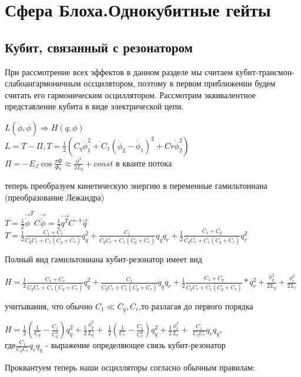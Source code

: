 \documentclass[12pt, twoside]{report}
\begin{document}
	\section{Сфера Блоха.Однокубитные гейты}

	\subsection{Кубит, связанный с резонатором}
	При рассмотрение всех эффектов в данном разделе мы считаем кубит-трансмон-слабоангармоничным оссцилятором, поэтому в первом приближении будем считать его гармоническим осциллятором. Рассмотрим эквивалентное представление кубита в виде электрической цепи.
\begin{center}
$L(\dot{\phi},\phi)\Rightarrow H(q,\phi)$\\
	$L=T-\Pi, T=\frac{1}{2}(C_{q}\dot{\phi}_1^2 + C_1(\dot{\phi}_2 - \dot{\phi}_1)^2 + Cr\dot{\phi}_2^2)$\\
	$\Pi= -E_J\cos{\frac{\pi\Phi}{\Phi_0}} \approx \frac{\phi^2}{2L_q}+const$ в кванте потока
\end{center}
	теперь преобразуем кинетическую энергию в переменные гамильтониана (преобразование Лежандра)
\begin{center}	
	$T=\frac{1}{2}\vec{\dot{\phi}}^TC\vec{\dot{\phi}} = \frac{1}{2}\vec{q^T}C^{-1}\vec{q}$
	$T=\frac{1}{2}\frac{C_1+C_r}{C_qC_r + C_1(C_q + C_r)}q_q^2+
	\frac{C_1}{C_qC_r + C_1(C_q+C_r)}q_qq_r+
	\frac{1}{2}\frac{C_1 + C_q} {C_qC_r + C_1(C_q + C_r)}q_r^2$\\
\end{center}
Полный вид гамильтониана кубит-резонатор имеет вид
\begin{center}	
$H=\frac{1}{2}\frac{C_1+C_r}{C_qC_r + C_1(C_q + C_r)}q_q^2+
	\frac{C_1}{C_qC_r + C_1(C_q+C_r)}q_qq_r+
	\frac{1}{2}\frac{C_1 + C_q} {C_qC_r + C_1(C_q + C_r)}*q_r^2 + \frac{\phi_q^2}{2L_q}+\frac{\phi_r^2}{2L_r}$
\end{center}
учитывания, что обычно $C_1 \ll C_q,C_r$,то разлагая до первого порядка  
\begin{center}	
$H=\frac{1}{2}(\frac{1}{C_q}-\frac{C_1}{C_q^2})q_q^2+\frac{1}{2}\frac{\phi_q^2}{L_q}+$
$\frac{1}{2}(\frac{1}{C_r}-\frac{C_1}{C_r^2})q_q^2+\frac{1}{2}\frac{\phi_r^2}{L_r}+$
$\frac{C_1}{C_qC_r}q_rq_q$,\\
где$\frac{C_1}{C_qC_r}q_rq_q$ - выражение определяющее связь кубит-резонатор\\
\end{center}
Проквантуем теперь наши осцилляторы согласно обычным правилам:
\end{document}
